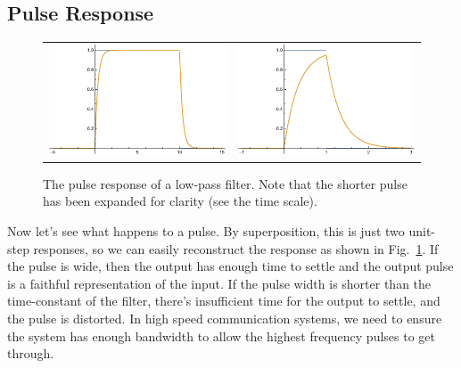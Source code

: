 \subsection{Pulse Response}
\begin{figure}[tb]
\begin{center}
\begin{tabular}{cc}
\includegraphics[width=.4\columnwidth]{long_pulse.pdf} &
\includegraphics[width=.4\columnwidth]{fast_pulse.pdf} \\
\end{tabular}
\end{center}
\caption{The pulse response of a low-pass filter.  Note that the shorter pulse has been expanded for clarity (see the time scale). }
\label{fig:pulse_resp}
\end{figure}
Now let's see what happens to a pulse.  By superposition, this is just two unit-step responses, so we can easily reconstruct the response as shown in Fig.~\ref{fig:pulse_resp}.  If the pulse is wide, then the output has enough time to settle and the output pulse is a faithful representation of the input.  If the pulse width is shorter than the time-constant of the filter, there's insufficient time for the output to settle, and the pulse is distorted.  In high speed communication systems, we need to ensure the system has enough bandwidth to allow the highest frequency pulses to get through.  
